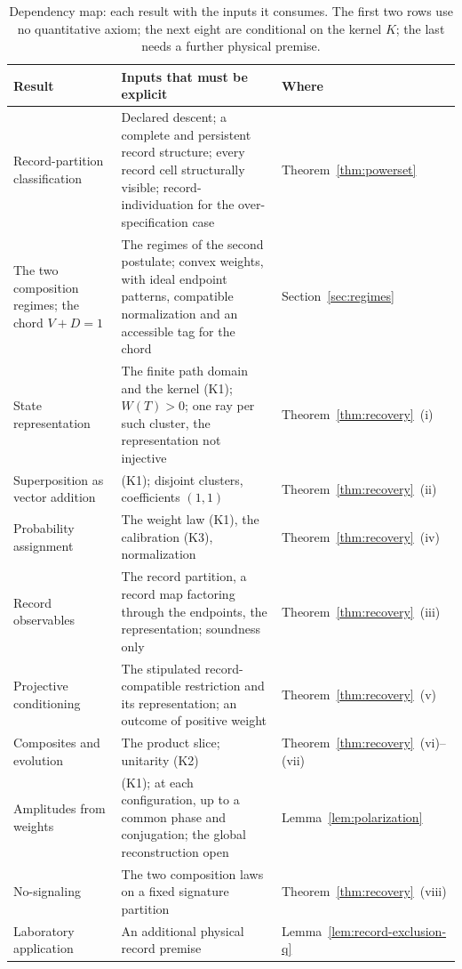 \begin{table}[htbp]
\centering
\small
\caption{Dependency map: each result with the inputs it consumes. The first two rows use no quantitative axiom; the next eight are conditional on the kernel $K$; the last needs a further physical premise.}
\label{tab:kernel-boundary}
\begin{tabular}{p{} p{} p{}}
\toprule
\textbf{Result} & \textbf{Inputs that must be explicit} & \textbf{Where} \\
\midrule
Record-partition classification & Declared descent; a complete and persistent record structure; every record cell structurally visible; record-individuation for the over-specification case & Theorem~\ref{thm:powerset} \\
The two composition regimes; the chord $V + D = 1$ & The regimes of the second postulate; convex weights, with ideal endpoint patterns, compatible normalization and an accessible tag for the chord & Section~\ref{sec:regimes} \\
State representation & The finite path domain and the kernel (K1); $W(T) > 0$; one ray per such cluster, the representation not injective & Theorem~\ref{thm:recovery}~(i) \\
Superposition as vector addition & (K1); disjoint clusters, coefficients $(1,1)$ & Theorem~\ref{thm:recovery}~(ii) \\
Probability assignment & The weight law (K1), the calibration (K3), normalization & Theorem~\ref{thm:recovery}~(iv) \\
Record observables & The record partition, a record map factoring through the endpoints, the representation; soundness only & Theorem~\ref{thm:recovery}~(iii) \\
Projective conditioning & The stipulated record-compatible restriction and its representation; an outcome of positive weight & Theorem~\ref{thm:recovery}~(v) \\
Composites and evolution & The product slice; unitarity (K2) & Theorem~\ref{thm:recovery}~(vi)--(vii) \\
Amplitudes from weights & (K1); at each configuration, up to a common phase and conjugation; the global reconstruction open & Lemma~\ref{lem:polarization} \\
No-signaling & The two composition laws on a fixed signature partition & Theorem~\ref{thm:recovery}~(viii) \\
Laboratory application & An additional physical record premise & Lemma~\ref{lem:record-exclusion-q} \\
\bottomrule
\end{tabular}
\end{table}

